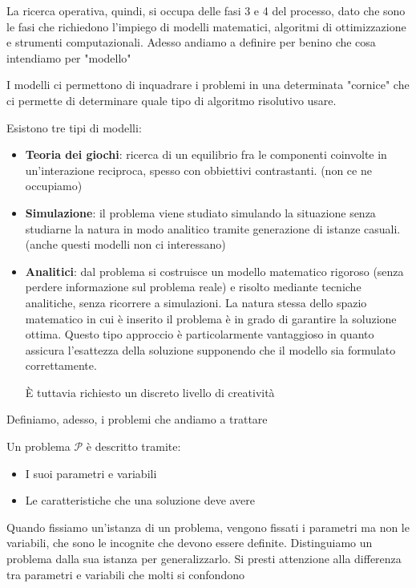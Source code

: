 \documentclass{report}
\begin{document}
La ricerca operativa, quindi, si occupa delle fasi 3 e 4 del processo, dato che sono le fasi che richiedono l’impiego di modelli matematici, algoritmi di ottimizzazione e strumenti computazionali. Adesso andiamo a definire per benino che cosa intendiamo per "modello" 

I modelli ci permettono di inquadrare i problemi in una determinata "cornice" che ci permette di determinare quale tipo di algoritmo risolutivo usare.

Esistono tre tipi di modelli:
\begin{itemize}
\item \textbf{Teoria dei giochi}: ricerca di un equilibrio fra le componenti coinvolte in un'interazione reciproca, spesso con obbiettivi contrastanti. (non ce ne occupiamo)
\item \textbf{Simulazione}: il problema viene studiato simulando la situazione senza studiarne la natura in modo analitico tramite generazione di istanze casuali. (anche questi modelli non ci interessano)
\item \textbf{Analitici}: dal problema si costruisce un modello matematico rigoroso (senza perdere informazione sul problema reale) e risolto mediante tecniche analitiche, senza ricorrere a simulazioni. La natura stessa dello spazio matematico in cui è inserito il problema è in grado di garantire la soluzione ottima. Questo tipo approccio è particolarmente vantaggioso in quanto assicura l’esattezza della soluzione supponendo che il modello sia formulato correttamente. 

È tuttavia richiesto un discreto livello di creatività
\end{itemize}

Definiamo, adesso, i problemi che andiamo a trattare

Un problema $ \mathcal{P} $ è descritto tramite:
\begin{itemize}
  \item I suoi parametri e variabili
  \item Le caratteristiche che una soluzione deve avere
\end{itemize}

Quando fissiamo un'istanza di un problema, vengono fissati i parametri ma non le variabili, che sono le incognite che devono essere definite. Distinguiamo un problema dalla sua istanza per generalizzarlo. Si presti attenzione alla differenza tra parametri e variabili che molti si confondono
\end{document}
